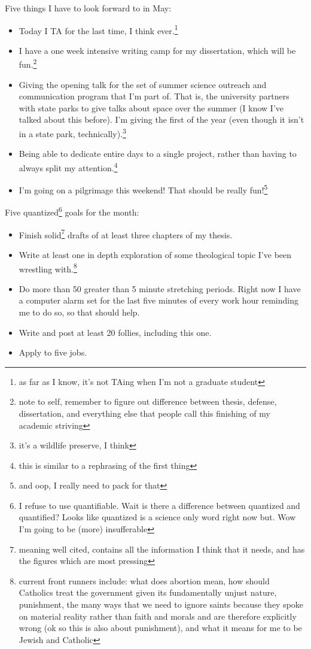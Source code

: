 \documentclass[12pt]{article}
\renewcommand{\,}{\textsuperscript{,}}
\begin{document}
Five things I have to look forward to in May:  
\begin{itemize}  
\item Today I TA for the last time, I think ever.\footnote{as far as I know, it's not TAing when I'm not a graduate student}  
\item I have a one week intensive writing camp for my dissertation, which will be fun.\footnote{note to self, remember to figure out difference between thesis, defense, dissertation, and everything else that people call this finishing of my academic striving}  
\item Giving the opening talk for the set of summer science outreach and communication program that I'm part of. That is, the university partners with state parks to give talks about space over the summer (I know I've talked about this before). I'm giving the first of the year (even though it isn't in a state park, technically).\footnote{it's a wildlife preserve, I think}  
\item Being able to dedicate entire days to a single project, rather than having to always split my attention.\footnote{this is similar to a rephrasing of the first thing}  
\item I'm going on a pilgrimage this weekend! That should be really fun!\footnote{and oop, I really need to pack for that}  
\end{itemize}

Five quantized\footnote{I refuse to use quantifiable. Wait is there a difference between quantized and quantified? Looks like quantized is a science only word right now but. Wow I'm going to be (more) insufferable} goals for the month:  
\begin{itemize}  
\item Finish solid\footnote{meaning well cited, contains all the information I think that it needs, and has the figures which are most pressing} drafts of at least three chapters of my thesis.  
\item Write at least one in depth exploration of some theological topic I've been wrestling with.\footnote{current front runners include: what does abortion mean, how should Catholics treat the government given its fundamentally unjust nature, punishment, the many ways that we need to ignore saints because they spoke on material reality rather than faith and morals and are therefore explicitly wrong (ok so this is also about punishment), and what it means for me to be Jewish and Catholic}  
\item Do more than 50 greater than 5 minute stretching periods. Right now I have a computer alarm set for the last five minutes of every work hour reminding me to do so, so that should help.  
\item Write and post at least 20 follies, including this one.  
\item Apply to five jobs.  
\end{itemize}
\end{document}
